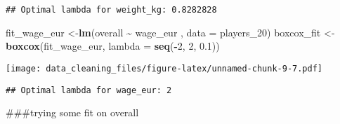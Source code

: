 \documentclass[
]{article}
\newenvironment{Shaded}{\begin{snugshade}}{\end{snugshade}}
\newcommand{\AttributeTok}[1]{\textcolor[rgb]{0.13,0.29,0.53}{#1}}
\newcommand{\DecValTok}[1]{\textcolor[rgb]{0.00,0.00,0.81}{#1}}
\newcommand{\FloatTok}[1]{\textcolor[rgb]{0.00,0.00,0.81}{#1}}
\newcommand{\FunctionTok}[1]{\textcolor[rgb]{0.13,0.29,0.53}{\textbf{#1}}}
\newcommand{\NormalTok}[1]{#1}
\newcommand{\OtherTok}[1]{\textcolor[rgb]{0.56,0.35,0.01}{#1}}
\newcommand{\SpecialCharTok}[1]{\textcolor[rgb]{0.81,0.36,0.00}{\textbf{#1}}}
\newcommand{\StringTok}[1]{\textcolor[rgb]{0.31,0.60,0.02}{#1}}
\begin{document}
\begin{verbatim}
## Optimal lambda for weight_kg: 0.8282828
\end{verbatim}

\begin{Shaded}
\begin{Highlighting}[]
\NormalTok{fit\_wage\_eur }\OtherTok{\textless{}{-}}\FunctionTok{lm}\NormalTok{(overall }\SpecialCharTok{\textasciitilde{}}\NormalTok{ wage\_eur , }\AttributeTok{data =}\NormalTok{ players\_20)}
\NormalTok{boxcox\_fit }\OtherTok{\textless{}{-}} \FunctionTok{boxcox}\NormalTok{(fit\_wage\_eur, }\AttributeTok{lambda =} \FunctionTok{seq}\NormalTok{(}\SpecialCharTok{{-}}\DecValTok{2}\NormalTok{, }\DecValTok{2}\NormalTok{, }\FloatTok{0.1}\NormalTok{))}
\end{Highlighting}
\end{Shaded}

\texttt{[image: data\_cleaning\_files/figure-latex/unnamed-chunk-9-7.pdf]}

\begin{Shaded}
\end{Shaded}

\begin{verbatim}
## Optimal lambda for wage_eur: 2
\end{verbatim}

\#\#\#trying some fit on overall
\end{document}
